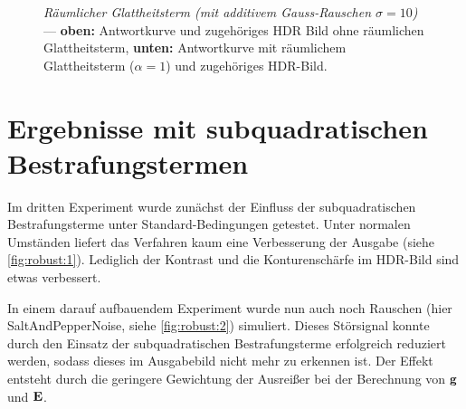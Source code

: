 \begin{figure}
  \begin{center}
    
    \caption{\textit{Räumlicher Glattheitsterm (mit additivem Gauss-Rauschen $\sigma = 10$)} --- \textbf{oben:} Antwortkurve und zugehöriges HDR Bild ohne räumlichen Glattheitsterm, \textbf{unten:} Antwortkurve mit räumlichem Glattheitsterm ($\alpha = 1$) und zugehöriges HDR-Bild.}
    \label{fig:raum:2}
  \end{center}
\end{figure}

\section{Ergebnisse mit subquadratischen Bestrafungstermen}

Im dritten Experiment wurde zunächst der Einfluss der subquadratischen Bestrafungsterme unter Standard-Bedingungen getestet. Unter normalen Umständen liefert das Verfahren kaum eine Verbesserung der Ausgabe (siehe \autoref{fig:robust:1}). Lediglich der Kontrast und die Konturenschärfe im \gls{HDR}-Bild sind etwas verbessert. 

In einem darauf aufbauendem Experiment wurde nun auch noch Rauschen (hier \gls{SaltAndPepperNoise}, siehe \autoref{fig:robust:2}) simuliert. Dieses Störsignal konnte durch den Einsatz der subquadratischen Bestrafungsterme erfolgreich reduziert werden, sodass dieses im Ausgabebild nicht mehr zu erkennen ist. Der Effekt entsteht durch die geringere Gewichtung der Ausreißer bei der Berechnung von $\mathbf g$ und $\mathbf E$.


